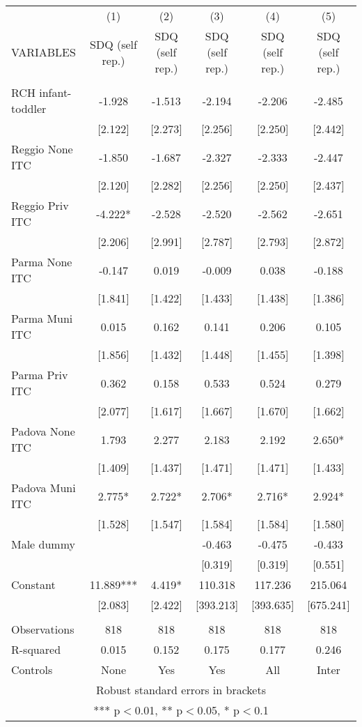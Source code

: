 \begin{tabular}{lccccc} \hline
 & (1) & (2) & (3) & (4) & (5) \\
VARIABLES & SDQ (self rep.) & SDQ (self rep.) & SDQ (self rep.) & SDQ (self rep.) & SDQ (self rep.) \\ \hline
 &  &  &  &  &  \\
RCH infant-toddler & -1.928 & -1.513 & -2.194 & -2.206 & -2.485 \\
 & [2.122] & [2.273] & [2.256] & [2.250] & [2.442] \\
Reggio None ITC & -1.850 & -1.687 & -2.327 & -2.333 & -2.447 \\
 & [2.120] & [2.282] & [2.256] & [2.250] & [2.437] \\
Reggio Priv ITC & -4.222* & -2.528 & -2.520 & -2.562 & -2.651 \\
 & [2.206] & [2.991] & [2.787] & [2.793] & [2.872] \\
Parma None ITC & -0.147 & 0.019 & -0.009 & 0.038 & -0.188 \\
 & [1.841] & [1.422] & [1.433] & [1.438] & [1.386] \\
Parma Muni ITC & 0.015 & 0.162 & 0.141 & 0.206 & 0.105 \\
 & [1.856] & [1.432] & [1.448] & [1.455] & [1.398] \\
Parma Priv ITC & 0.362 & 0.158 & 0.533 & 0.524 & 0.279 \\
 & [2.077] & [1.617] & [1.667] & [1.670] & [1.662] \\
Padova None ITC & 1.793 & 2.277 & 2.183 & 2.192 & 2.650* \\
 & [1.409] & [1.437] & [1.471] & [1.471] & [1.433] \\
Padova Muni ITC & 2.775* & 2.722* & 2.706* & 2.716* & 2.924* \\
 & [1.528] & [1.547] & [1.584] & [1.584] & [1.580] \\
Male dummy &  &  & -0.463 & -0.475 & -0.433 \\
 &  &  & [0.319] & [0.319] & [0.551] \\
Constant & 11.889*** & 4.419* & 110.318 & 117.236 & 215.064 \\
 & [2.083] & [2.422] & [393.213] & [393.635] & [675.241] \\
 &  &  &  &  &  \\
Observations & 818 & 818 & 818 & 818 & 818 \\
R-squared & 0.015 & 0.152 & 0.175 & 0.177 & 0.246 \\
 Controls & None & Yes & Yes & All & Inter \\ \hline
\multicolumn{6}{c}{ Robust standard errors in brackets} \\
\multicolumn{6}{c}{ *** p$<$0.01, ** p$<$0.05, * p$<$0.1} \\
\end{tabular}
